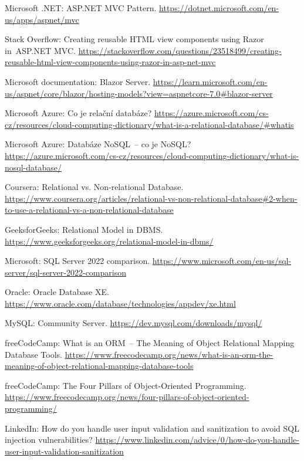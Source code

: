 \begin{thebibliography}{99}
Microsoft .NET: ASP.NET MVC Pattern.
\url{https://dotnet.microsoft.com/en-us/apps/aspnet/mvc}

Stack Overflow: Creating reusable HTML view components using Razor in~ASP.NET MVC.
\url{https://stackoverflow.com/questions/23518499/creating-reusable-html-view-components-using-razor-in-asp-net-mvc}

Microsoft documentation: Blazor Server.
\url{https://learn.microsoft.com/en-us/aspnet/core/blazor/hosting-models?view=aspnetcore-7.0\#blazor-server}

Microsoft Azure: Co je relační databáze?
\url{https://azure.microsoft.com/cs-cz/resources/cloud-computing-dictionary/what-is-a-relational-database/\#whatis}

Microsoft Azure: Databáze NoSQL~-- co je NoSQL?
\url{https://azure.microsoft.com/cs-cz/resources/cloud-computing-dictionary/what-is-nosql-database/}

Coursera: Relational vs. Non-relational Database.
\url{https://www.coursera.org/articles/relational-vs-non-relational-database#2-when-to-use-a-relational-vs-a-non-relational-database}

GeeksforGeeks: Relational Model in DBMS.
\url{https://www.geeksforgeeks.org/relational-model-in-dbms/}

Microsoft: SQL Server 2022 comparison.
\url{https://www.microsoft.com/en-us/sql-server/sql-server-2022-comparison}

Oracle: Oracle Database XE.
\url{https://www.oracle.com/database/technologies/appdev/xe.html}

MySQL: Community Server.
\url{https://dev.mysql.com/downloads/mysql/}

freeCodeCamp: What is an ORM~-- The Meaning of Object Relational Mapping Database Tools.
\url{https://www.freecodecamp.org/news/what-is-an-orm-the-meaning-of-object-relational-mapping-database-tools}

freeCodeCamp: The Four Pillars of Object-Oriented Programming.
\url{https://www.freecodecamp.org/news/four-pillars-of-object-oriented-programming/}

LinkedIn: How do you handle user input validation and sanitization to avoid SQL injection vulnerabilities?
\url{https://www.linkedin.com/advice/0/how-do-you-handle-user-input-validation-sanitization}


\end{thebibliography}
